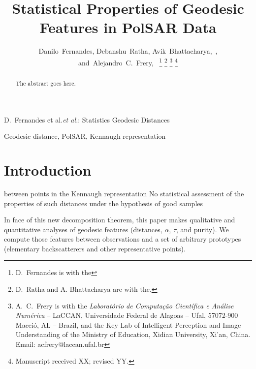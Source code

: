 \documentclass[journal]{IEEEtran}
\begin{document}
\title{Statistical Properties of Geodesic Features in PolSAR Data}

\author{Danilo~Fernandes,
        Debanshu~Ratha,
        Avik~Bhattacharya,~,
        and~Alejandro~C.~Frery,~%
\thanks{D.\ Fernandes is with the}%
\thanks{D.\ Ratha and A. Bhattacharya are with the.}%
\thanks{A.\ C.\ Frery is with the \textit{Laborat\'orio de Computa\c c\~ao Cient\'ifica e An\'alise Num\'erica} -- LaCCAN, 
	Universidade Federal de Alagoas -- Ufal, 
	57072-900 Macei\'o, AL -- Brazil, and the Key Lab of Intelligent Perception and Image Understanding of the Ministry of Education, Xidian University, Xi'an, China. Email: acfrery@laccan.ufal.br}
\thanks{Manuscript received XX; revised YY.}}

%
{D.\ Fernandes et al.\MakeLowercase{\textit{et al.}}: Statistics Geodesic Distances}

\maketitle

\begin{abstract}
The abstract goes here.
\end{abstract}

\begin{IEEEkeywords}
Geodesic distance, PolSAR, Kennaugh representation
\end{IEEEkeywords}

\IEEEpeerreviewmaketitle



\section{Introduction}

 between points in the Kennaugh representation
No statistical assessment of the properties of such distances under the hypothesis of good samples



In face of this new decomposition theorem, this paper makes qualitative and quantitative analyses of geodesic features (distances, $\alpha$, $\tau$, and purity).
We compute those features between observations and a set of arbitrary prototypes (elementary backscatterers and other representative points).
\end{document}
